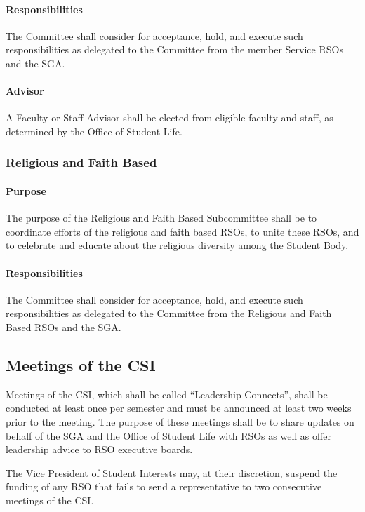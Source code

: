 \documentclass[12pt]{scrreprt}
\begin{document}
\paragraph{Responsibilities}
The Committee shall consider for acceptance, hold, and execute such
responsibilities as delegated to the Committee from the member Service
RSOs and the SGA.

\paragraph{Advisor}
A Faculty or Staff Advisor shall be elected from eligible faculty and
staff, as determined by the Office of Student Life.

\subsubsection{Religious and Faith Based}

\paragraph{Purpose}
​The purpose of the Religious and Faith Based Subcommittee shall be to coordinate efforts of the religious and faith based RSOs, to unite these RSOs, and to celebrate and educate about the religious diversity among the Student Body.

\paragraph{Responsibilities}
​The Committee shall consider for acceptance, hold, and execute such responsibilities as delegated to the Committee from the Religious and Faith Based RSOs and the SGA.

\subsection{Meetings of the CSI}
Meetings of the CSI, which shall be called ``Leadership Connects'', shall be conducted at least once per semester and must be announced at least two weeks prior to the meeting. The purpose of these meetings shall be to share updates on behalf of the SGA and the Office of Student Life with RSOs as well as offer leadership advice to RSO executive boards.

The Vice President of Student Interests may, at their discretion, suspend the funding of any RSO that fails to send a representative to two consecutive meetings of the CSI.
\end{document}
